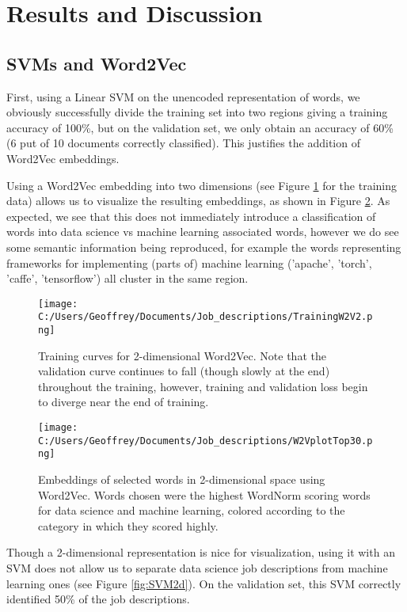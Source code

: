 \documentclass[12pt]{article}
\begin{document}
\section{Results and Discussion}
\subsection{SVMs and Word2Vec} First, using a Linear SVM on the unencoded representation of words, we obviously successfully divide the training set into two regions giving a training accuracy of 100\%, but on the validation set, we only obtain an accuracy of 60\% (6 put of 10 documents correctly classified). This justifies the addition of Word2Vec embeddings.

Using a Word2Vec embedding into two dimensions (see Figure \ref{fig:trainW2V2} for the training data) allows us to visualize the resulting embeddings, as shown in Figure \ref{fig:W2VEmb}. As expected, we see that this does not immediately introduce a classification of words into data science vs machine learning associated words, however we do see some semantic information being reproduced, for example the words representing frameworks for implementing (parts of) machine learning ('apache', 'torch', 'caffe', 'tensorflow') all cluster in the same region.

\begin{figure}[h]
\texttt{[image: C:/Users/Geoffrey/Documents/Job\_descriptions/TrainingW2V2.png]}
\caption{\label{fig:trainW2V2} Training curves for 2-dimensional Word2Vec. Note that the validation curve continues to fall (though slowly at the end) throughout the training, however, training and validation loss begin to diverge near the end of training.}
\end{figure}

\begin{figure}[h]
\texttt{[image: C:/Users/Geoffrey/Documents/Job\_descriptions/W2VplotTop30.png]}
\caption{\label{fig:W2VEmb} Embeddings of selected words in 2-dimensional space using Word2Vec. Words chosen were the highest WordNorm scoring words for data science and machine learning, colored according to the category in which they scored highly.}
\end{figure}

Though a 2-dimensional representation is nice for visualization, using it with an SVM does not allow us to separate data science job descriptions from machine learning ones (see Figure \ref{fig:SVM2d}). On the validation set, this SVM correctly identified 50\% of the job descriptions.
\end{document}
